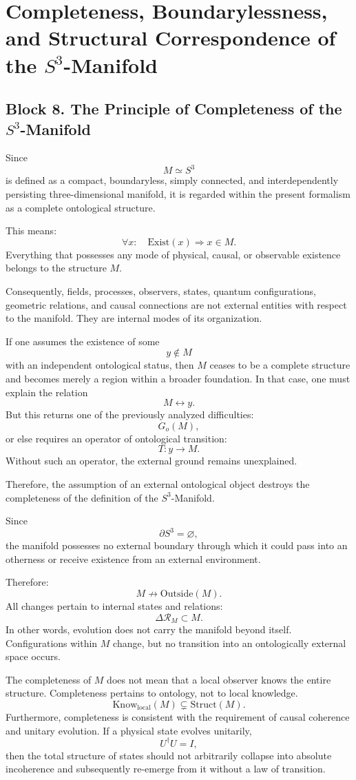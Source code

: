 \documentclass[12pt,a4paper]{article}
\theoremstyle{definition}
\begin{document}
\section{Completeness, Boundarylessness, and Structural Correspondence of the \(S^3\)-Manifold}
\subsection{Block 8. The Principle of Completeness of the \(S^3\)-Manifold}
Since
\[
M\simeq S^3
\]
is defined as a compact, boundaryless, simply connected, and interdependently persisting three-dimensional manifold, it is regarded within the present formalism as a complete ontological structure.

This means:
\[
\forall x:\quad \mathrm{Exist}(x)\Rightarrow x\in M.
\]
Everything that possesses any mode of physical, causal, or observable existence belongs to the structure \(M\).

Consequently, fields, processes, observers, states, quantum configurations, geometric relations, and causal connections are not external entities with respect to the manifold. They are internal modes of its organization.

If one assumes the existence of some
\[
y\notin M
\]
with an independent ontological status, then \(M\) ceases to be a complete structure and becomes merely a region within a broader foundation. In that case, one must explain the relation
\[
M\leftrightarrow y.
\]
But this returns one of the previously analyzed difficulties:
\[
G_o(M),
\]
or else requires an operator of ontological transition:
\[
T:y\to M.
\]
Without such an operator, the external ground remains unexplained.

Therefore, the assumption of an external ontological object destroys the completeness of the definition of the \(S^3\)-Manifold.

Since
\[
\partial S^3=\varnothing,
\]
the manifold possesses no external boundary through which it could pass into an otherness or receive existence from an external environment.

Therefore:
\[
M\not\to \mathrm{Outside}(M).
\]
All changes pertain to internal states and relations:
\[
\Delta\mathcal R_M\subset M.
\]
In other words, evolution does not carry the manifold beyond itself. Configurations within \(M\) change, but no transition into an ontologically external space occurs.

The completeness of \(M\) does not mean that a local observer knows the entire structure. Completeness pertains to ontology, not to local knowledge.
\[
\mathrm{Know}_{\mathrm{local}}(M)\subsetneq \mathrm{Struct}(M).
\]
Furthermore, completeness is consistent with the requirement of causal coherence and unitary evolution. If a physical state evolves unitarily,
\[
U^\dagger U=I,
\]
then the total structure of states should not arbitrarily collapse into absolute incoherence and subsequently re-emerge from it without a law of transition.
\end{document}
